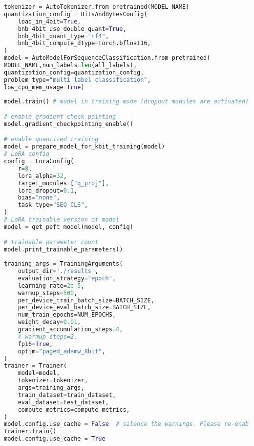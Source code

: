 \begin{latin}
    \begin{lstlisting}[language=Python, title=\rl{بارگذاری توکنایزر و مدل و کوانتیزه کردن مدل}]
tokenizer = AutoTokenizer.from_pretrained(MODEL_NAME)
quantization_config = BitsAndBytesConfig(
    load_in_4bit=True,
    bnb_4bit_use_double_quant=True,
    bnb_4bit_quant_type="nf4",
    bnb_4bit_compute_dtype=torch.bfloat16,
)
model = AutoModelForSequenceClassification.from_pretrained(
MODEL_NAME,num_labels=len(all_labels),
quantization_config=quantization_config,
problem_type="multi_label_classification",
low_cpu_mem_usage=True)
\end{lstlisting}
\end{latin}

\begin{latin}
    \begin{lstlisting}[language=Python, title=\rl{استفاده از حالت مصرف بهینه رم برای پارامتر ها با استفاده از \lr{PEFT}}]
model.train() # model in training mode (dropout modules are activated)

# enable gradient check pointing
model.gradient_checkpointing_enable()

# enable quantized training
model = prepare_model_for_kbit_training(model)
# LoRA config
config = LoraConfig(
    r=8,
    lora_alpha=32,
    target_modules=["q_proj"],
    lora_dropout=0.1,
    bias="none",
    task_type="SEQ_CLS",
)
# LoRA trainable version of model
model = get_peft_model(model, config)

# trainable parameter count
model.print_trainable_parameters()
\end{lstlisting}
\end{latin}

\begin{latin}
    \begin{lstlisting}[language=Python, title=\rl{آموزش دادن مدل}]
training_args = TrainingArguments(
	output_dir='./results',
	evaluation_strategy="epoch",
	learning_rate=2e-5,
	warmup_steps=500,
	per_device_train_batch_size=BATCH_SIZE,
	per_device_eval_batch_size=BATCH_SIZE,
	num_train_epochs=NUM_EPOCHS,
	weight_decay=0.01,
	gradient_accumulation_steps=4,
	# warmup_steps=2,
	fp16=True,
	optim="paged_adamw_8bit",
)
trainer = Trainer(
    model=model,
    tokenizer=tokenizer,
    args=training_args,
    train_dataset=train_dataset,
    eval_dataset=test_dataset,
    compute_metrics=compute_metrics,
)
model.config.use_cache = False  # silence the warnings. Please re-enable for inference!
trainer.train()
model.config.use_cache = True
\end{lstlisting}
\end{latin}
\clearpage